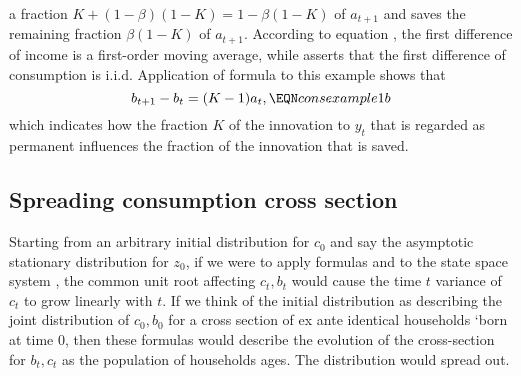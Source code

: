  a fraction $K + (1-\beta) (1-K) = 1 - \beta (1-K)$  of $a_{t+1}$ and saves the remaining fraction $\beta (1-K)$ of $a_{t+1}$.
  According to equation , the first difference of income is a first-order moving average, while 
  asserts that the first difference of consumption is   i.i.d.
  Application of formula 
to this example shows that
$$ b_{t+1} - b_t = (K-1) a_t , \EQN consexample1b $$
which indicates how the fraction $K$ of the innovation to $y_t$ that is regarded as permanent influences the fraction of the innovation that is saved.



\subsection{Spreading consumption cross section}

Starting from an arbitrary initial distribution for $c_0$ and say the asymptotic stationary  distribution for $z_0$, if we were to apply formulas  and  to the state space system ,
the common  unit root affecting $c_t, b_t$ would cause  the time $t$ variance of $c_t$ to grow linearly with $t$.
If we think of the initial distribution as describing the joint distribution of $c_0, b_0$ for a cross section
of ex ante identical households `born at time $0$, then these formulas would describe the evolution of the cross-section
for $b_t, c_t$ as the population of households ages.  The distribution would spread out.
